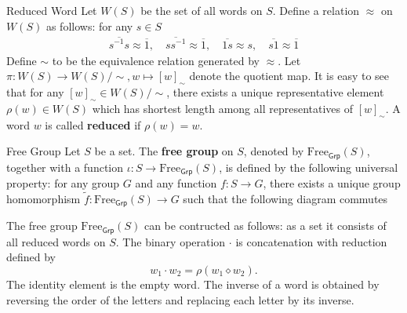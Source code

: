 \begin{definition}{Reduced Word}{}
    Let $W(S)$ be the set of all words on $S$. Define a relation $\approx$ on $W(S)$ as follows: for any $s\in S$
    \begin{align*}
        \overline{s^{-1}s}\approx \overline{1},\quad \overline{ss^{-1}}\approx \overline{1}, \quad \overline{1s}\approx s,\quad \overline{s1}\approx \overline{1}
    \end{align*}
    Define $\sim$ to be the equivalence relation generated by $\approx$. Let $\pi:W(S)\to W(S)/\sim, w\mapsto [w]_\sim$ denote the quotient map. It is easy to see that for any $[w]_\sim\in W(S)/\sim$, there exists a unique representative element $\rho(w)\in W(S)$ which has shortest length among all representatives of $[w]_\sim$. A word $w$ is called \textbf{reduced} if $\rho(w)=w$.
\end{definition}


\begin{definition}{Free Group}{}
    Let $S$ be a set. The \textbf{free group} on $S$, denoted by $\mathrm{Free}_{\mathsf{Grp}}(S)$, together with a function $\iota:S\to \mathrm{Free}_{\mathsf{Grp}}(S)$, is defined by the following universal property: for any group $G$ and any function $f:S\to G$, there exists a unique group homomorphism $\widetilde{f}:\mathrm{Free}_{\mathsf{Grp}}(S)\to G$ such that the following diagram commutes
    \begin{center}
    \end{center}
    The free group $\mathrm{Free}_{\mathsf{Grp}}(S)$ can be contructed as follows: as a set it consists of all reduced words on $S$. The binary operation $\cdot$ is concatenation with reduction defined by
    \[
        w_1\cdot w_2 = \rho(w_1\diamond w_2).
    \]
    The identity element is the empty word. The inverse of a word is obtained by reversing the order of the letters and replacing each letter by its inverse.
\end{definition}


